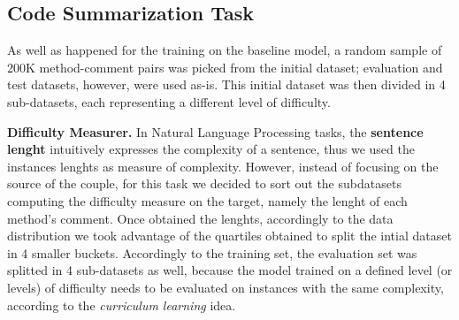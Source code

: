 \subsection{Code Summarization Task}
As well as happened for the training on the baseline model, a random sample of 200K method-comment pairs was picked from the initial dataset;
evaluation and test datasets, however, were used as-is. This initial dataset was then divided in 4 sub-datasets, each representing a different
level of difficulty.
\newline




\noindent\textbf{Difficulty Measurer.} In Natural Language Processing tasks, the \textbf{sentence lenght} intuitively expresses the complexity 
of a sentence, thus we used the instances lenghts as measure of complexity. 
However, instead of focusing on the source of the couple, for this task we decided to sort out the subdatasets computing the
difficulty measure on the target, namely the lenght of each method's comment. 
Once obtained the lenghts, accordingly to the data distribution we took advantage of the quartiles obtained to split the intial dataset in 4 smaller 
buckets. 
Accordingly to the training set, the evaluation set was splitted in 4 sub-datasets as well, because the model trained on a defined level (or levels) of difficulty
needs to be evaluated on instances with the same complexity, according to the \textit{curriculum learning} idea.\newline

